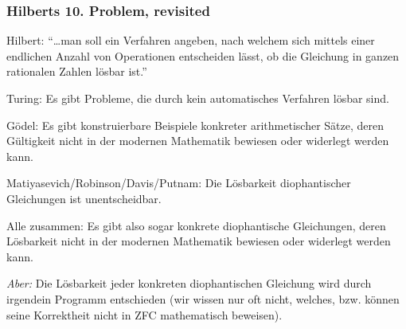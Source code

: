 \documentclass[aspectratio=1610,onlymath]{beamer}
\begin{document}
\begin{frame}\frametitle{Hilberts 10. Problem, revisited}

\alert{Hilbert:} "`\ldots man soll ein Verfahren angeben, nach welchem sich mittels einer endlichen Anzahl von Operationen entscheiden lässt, ob die Gleichung in ganzen rationalen Zahlen lösbar ist."'
\bigskip\pause

\alert{Turing:} Es gibt Probleme, die durch kein automatisches Verfahren lösbar sind.
\medskip\pause

\alert{Gödel:} Es gibt konstruierbare Beispiele konkreter arithmetischer Sätze, deren Gültigkeit nicht in der modernen Mathematik bewiesen oder widerlegt werden kann.
\medskip\pause

\alert{Matiyasevich/Robinson/Davis/Putnam:} Die Lösbarkeit diophantischer Gleichungen ist
unentscheidbar.
\medskip\pause

\alert{Alle zusammen:} Es gibt also sogar konkrete diophantische Gleichungen, deren Lösbarkeit nicht in der modernen Mathematik bewiesen oder widerlegt werden kann.\medskip\pause

{\tiny
\emph{Aber:} Die Lösbarkeit jeder konkreten diophantischen Gleichung wird durch irgendein Programm entschieden (wir wissen nur oft nicht, welches, bzw. können seine Korrektheit nicht in ZFC mathematisch beweisen).

}

\end{frame}



\end{document}
